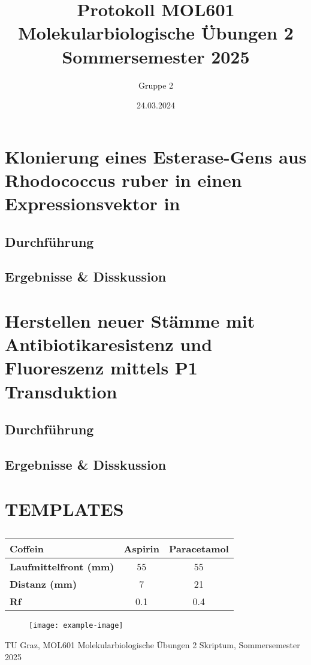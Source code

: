 \documentclass[11pt]{article}
\title{Protokoll MOL601 Molekularbiologische Übungen 2 \\
Sommersemester 2025}
\author{Gruppe 2}
\date{24.03.2024}
\begin{document}
\maketitle

\section{Klonierung eines Esterase-Gens aus Rhodococcus ruber in einen Expressionsvektor in \ecoli}
\subsection{Durchführung}
\subsection{Ergebnisse \& Disskussion}


\section{Herstellen neuer \ecoli Stämme mit Antibiotikaresistenz und Fluoreszenz mittels P1 Transduktion}
\subsection{Durchführung}
\subsection{Ergebnisse \& Disskussion}


\section{TEMPLATES}
\begin{table}[h!]
    \centering
    \caption{\textbf{
    }}
    \begin{tabular}{lcc}
    \toprule
    \textbf{Coffein} & \textbf{Aspirin} & \textbf{Paracetamol} \\
    \midrule
    \textbf{Laufmittelfront (mm)} & 55  & 55  \\
    \textbf{Distanz (mm)}         & 7   & 21  \\
    \midrule
    \textbf{Rf}                   & 0.1 & 0.4 \\
    \bottomrule
    \end{tabular}
    \caption*{\small
    }
    \label{tab:template}
\end{table}

\begin{figure}[h!]
    \centering
    \texttt{[image: example-image]}
    \caption{\small
    }
    \label{fig:template}
\end{figure}


\begin{thebibliography}{9}

    TU Graz, MOL601 Molekularbiologische Übungen 2 Skriptum, Sommersemester 2025

\end{thebibliography}
\end{document}
